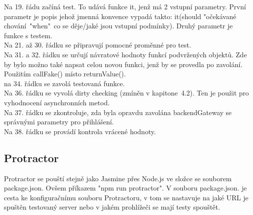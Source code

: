 \documentclass[czech,master,public,dept460,male,cpdeclaration,twoside]{diploma}
\begin{document}
Na 19. řádu začíná test. To udává funkce it, jenž má 2 vstupní parametry. První parametr je popis jehož jmenná konvence vypadá takto: it(should "očekávané chování~"when"~co se děje/jaké jsou vstupní podmínky). Druhý parametr je funkce s testem.\\
Na 21. až 30. řádku se připravují pomocné proměnné pro test.\\
Na 31. a 32. řádku se určují návratové hodnoty funkcí podvržených objektů. Zde by bylo možno také napsat celou novou funkci, jenž by se provedla po zavolání. Použitím callFake() místo returnValue().\\
na 34. řádku se zavolá testovaná funkce.\\
Na 36. řádku se vyvolá dirty checking (zmíněn v kapitone~4.2). Ten je použit pro vyhodnocení asynchronních metod.\\
Na 37. řádku se zkontroluje, zda byla opravdu zavolána backendGateway se správnými parametry pro přihlášení.\\
Na 38. řádku se provádí kontrola vrácené hodnoty.\\

\subsection{Protractor}
Protractor se pouští stejně jako Jasmine přes Node.js ve složce se souborem package.json. Ovšem příkazem "npm run protractor". V souboru package.json. je cesta ke konfiguračnímu souboru Protractoru, v tom se nastavuje na jaké URL je spuštěn testovaný server nebo v jakém prohlížeči se mají testy spouštět. 
\end{document}
